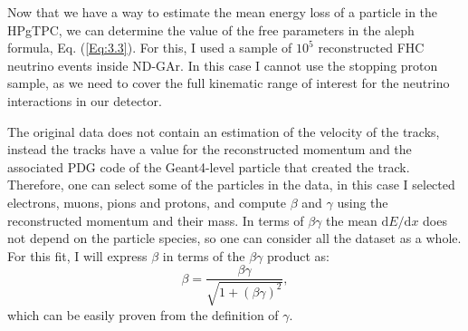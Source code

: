 Now that we have a way to estimate the mean energy loss of a particle in the HPgTPC, we can determine the value of the free parameters in the \gls{aleph} formula, Eq. (\ref{Eq:3.3}). For this, I used a sample of $10^{5}$ reconstructed FHC neutrino events inside ND-GAr. In this case I cannot use the stopping proton sample, as we need to cover the full kinematic range of interest for the neutrino interactions in our detector.

The original data does not contain an estimation of the velocity of the tracks, instead the tracks have a value for the reconstructed momentum and the associated PDG code of the Geant4-level particle that created the track. Therefore, one can select some of the particles in the data, in this case I selected electrons, muons, pions and protons, and compute $\beta$ and $\gamma$ using the reconstructed momentum and their mass. In terms of $\beta\gamma$ the mean $\mathrm{d}E/\mathrm{d}x$ does not depend on the particle species, so one can consider all the dataset as a whole. For this fit, I will express $\beta$ in terms of the $\beta\gamma$ product as:
\begin{equation}
    \beta = \frac{\beta\gamma}{\sqrt{1+(\beta\gamma)^{2}}},
\end{equation}
which can be easily proven from the definition of $\gamma$.

